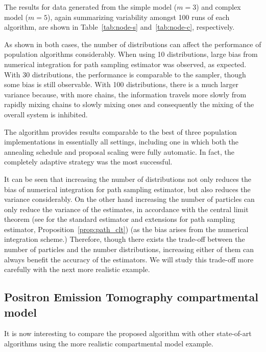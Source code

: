The results for data generated from the simple model ($m = 3$) and complex
model ($m = 5$), again summarizing variability amongst 100 runs of each
algorithm, are shown in Table~\ref{tab:node-s} and~\ref{tab:node-c},
respectively.




As shown in both cases, the number of distributions can affect the performance
of population \mcmc algorithms considerably. When using 10 distributions,
large bias from numerical integration for path sampling estimator was
observed, as expected. With 30 distributions, the performance is comparable to
the \smc[2] sampler, though some bias is still observable. With 100
distributions, there is a much larger variance because, with more chains, the
information travels more slowly from rapidly mixing chains to slowly mixing
ones and consequently the mixing of the overall system is inhibited.

The \smc algorithm provides results comparable to the best of
three population \mcmc implementations in essentially all settings, including
one in which both the annealing schedule and proposal scaling were fully
automatic. In fact, the completely adaptive strategy was the most successful.

It can be seen that increasing the number of distributions not only reduces
the bias of numerical integration for path sampling estimator, but also
reduces the variance considerably. On the other hand increasing the number of
particles can only reduce the variance of the estimates, in accordance with
the central limit theorem (see \cite{DelMoral:2006hc} for the standard
estimator and extensions for path sampling estimator,
Proposition~\ref{prop:path_clt}) (as the bias arises from the numerical
integration scheme.) Therefore, though there exists the trade-off between the
number of particles and the number distributions, increasing either of them
can always benefit the accuracy of the estimators. We will study this
trade-off more carefully with the next more realistic example.

\subsection{Positron Emission Tomography compartmental model}
\label{sub:Positron Emission Tomography compartmental model}

It is now interesting to compare the proposed algorithm with other
state-of-art algorithms using the more realistic \pet compartmental model
example.

